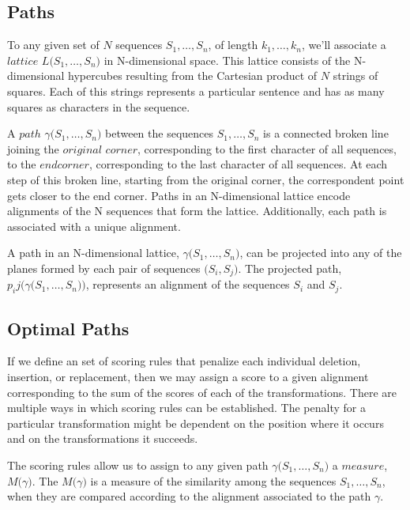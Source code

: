 \documentclass[11pt]{article}
\begin{document}
\subsection{Paths}

To any given set of $N$ sequences $S_1, \dots , S_n$, of length $k_1, \dots , k_n$, we'll associate a $lattice$ $L \big( S_1, \dots, S_n \big) $ in N-dimensional space. This lattice consists of the N-dimensional hypercubes resulting from the Cartesian product of $N$ strings of squares. Each of this strings represents a particular sentence and has as many squares as characters in the sequence. 

A $path$ $\gamma \big(S_1, \dots , S_n \big)$ between the sequences $S_1, \dots , S_n$ is a connected broken line joining the $original$ $corner$, corresponding to the first character of all sequences, to the $end corner$, corresponding to the last character of all sequences. At each step of this broken line, starting from the original corner, the correspondent point gets closer to the end corner. Paths in an N-dimensional lattice encode alignments of the N sequences that form the lattice. Additionally, each path is associated with a unique alignment.

A path in an N-dimensional lattice, $\gamma \big(S_1, \dots , S_n \big)$, can be projected into any of the planes formed by each pair of sequences $\big(S_i, S_j\big)$. The projected path, $p_ij\big(\gamma\big(S_1, \dots, S_n\big)\big)$, represents an alignment of the sequences $S_i$ and $S_j$.

\subsection{Optimal Paths}

If we define an set of scoring rules that penalize each individual deletion, insertion, or replacement, then we may assign a score to a given alignment corresponding to the sum of the scores of each of the transformations. There are multiple ways in which scoring rules can be established. The penalty for a particular transformation might be dependent on the position where it occurs and on the transformations it succeeds. 

The scoring rules allow us to assign to any given path $\gamma\big(S_1, \dots, S_n\big)$ a $measure$, $M\big(\gamma\big)$. The $M\big(\gamma\big)$ is a measure of the similarity among the sequences $S_1, \dots, S_n$, when they are compared according to the alignment associated to the path $\gamma$. 
\end{document}
